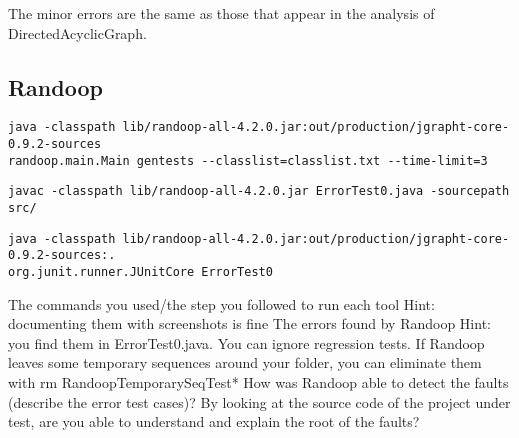 \documentclass[a4paper,12pt]{article} %
\begin{document}
	The minor errors are the same as those that appear in the analysis of DirectedAcyclicGraph.
		
	\subsection*{Randoop}
	
	\begin{lstlisting}[style=DOS,caption={Randoop Execution}, captionpos=b]
java -classpath lib/randoop-all-4.2.0.jar:out/production/jgrapht-core-0.9.2-sources 
randoop.main.Main gentests --classlist=classlist.txt --time-limit=3
	\end{lstlisting}
	

	\begin{lstlisting}[style=DOS,caption={Compile Error Revealing Test}, captionpos=b]
javac -classpath lib/randoop-all-4.2.0.jar ErrorTest0.java -sourcepath src/
\end{lstlisting}

	\begin{lstlisting}[style=DOS,caption={Execute Error Revealing Test}, captionpos=b]
java -classpath lib/randoop-all-4.2.0.jar:out/production/jgrapht-core-0.9.2-sources:. 
org.junit.runner.JUnitCore ErrorTest0
\end{lstlisting}	
	
The commands you used/the step you followed to run each tool 
Hint: documenting them with screenshots is fine 
The errors found by Randoop
Hint: you find them in ErrorTest0.java. You can ignore regression tests. If Randoop leaves some temporary sequences around your folder, you can eliminate them with rm RandoopTemporarySeqTest*
How was Randoop able to detect the faults (describe the error test cases)? By looking at the source code of the project under test, are you able to understand and explain the root of the faults?
	
\end{document}
